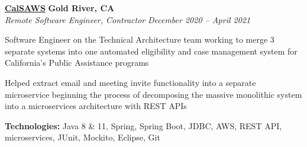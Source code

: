 %
    \headerrow
        {\textbf{\href{https://www.calsaws.org/}{CalSAWS}}}
        {\textbf{Gold River, CA}}
    \\
    \headerrow
        {\emph{Remote Software Engineer, Contractor}}
        {\emph{December 2020 -- April 2021}}
    \begin{itemize*}
        \item Software Engineer on the Technical Architecture team working to merge 3 separate systems into
            one automated eligibility and case management system for California's Public Assistance programs
        \item Helped extract email and meeting invite functionality into a separate microservice beginning the process of decomposing
            the massive monolithic system into a microservices architecture with REST APIs
    \end{itemize*}

    \hspace{1.0em}
        {\textbf{Technologies:} Java 8 \& 11, Spring, Spring Boot, JDBC, AWS, REST API, microservices, JUnit, Mockito, Eclipse, Git}

